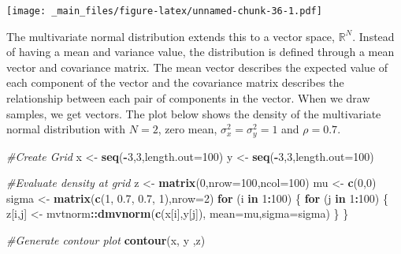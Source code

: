 \documentclass[
]{book}
\newenvironment{Shaded}{\begin{snugshade}}{\end{snugshade}}
\newcommand{\AttributeTok}[1]{\textcolor[rgb]{0.13,0.29,0.53}{#1}}
\newcommand{\CommentTok}[1]{\textcolor[rgb]{0.56,0.35,0.01}{\textit{#1}}}
\newcommand{\ControlFlowTok}[1]{\textcolor[rgb]{0.13,0.29,0.53}{\textbf{#1}}}
\newcommand{\DecValTok}[1]{\textcolor[rgb]{0.00,0.00,0.81}{#1}}
\newcommand{\FloatTok}[1]{\textcolor[rgb]{0.00,0.00,0.81}{#1}}
\newcommand{\FunctionTok}[1]{\textcolor[rgb]{0.13,0.29,0.53}{\textbf{#1}}}
\newcommand{\NormalTok}[1]{#1}
\newcommand{\OtherTok}[1]{\textcolor[rgb]{0.56,0.35,0.01}{#1}}
\newcommand{\SpecialCharTok}[1]{\textcolor[rgb]{0.81,0.36,0.00}{\textbf{#1}}}
\theoremstyle{definition}
\theoremstyle{definition}
\theoremstyle{definition}
\theoremstyle{definition}
\theoremstyle{remark}
\begin{document}
\texttt{[image: \_main\_files/figure-latex/unnamed-chunk-36-1.pdf]}

The multivariate normal distribution extends this to a vector space, \(\mathbb{R}^N\). Instead of having a mean and variance value, the distribution is defined through a mean vector and covariance matrix. The mean vector describes the expected value of each component of the vector and the covariance matrix describes the relationship between each pair of components in the vector. When we draw samples, we get vectors. The plot below shows the density of the multivariate normal distribution with \(N = 2\), zero mean, \(\sigma^2_x = \sigma^2_y = 1\) and \(\rho = 0.7\).

\begin{Shaded}
\begin{Highlighting}[]
\CommentTok{\#Create Grid}
\NormalTok{x }\OtherTok{\textless{}{-}} \FunctionTok{seq}\NormalTok{(}\SpecialCharTok{{-}}\DecValTok{3}\NormalTok{,}\DecValTok{3}\NormalTok{,}\AttributeTok{length.out=}\DecValTok{100}\NormalTok{)}
\NormalTok{y }\OtherTok{\textless{}{-}} \FunctionTok{seq}\NormalTok{(}\SpecialCharTok{{-}}\DecValTok{3}\NormalTok{,}\DecValTok{3}\NormalTok{,}\AttributeTok{length.out=}\DecValTok{100}\NormalTok{)}

\CommentTok{\#Evaluate density at grid}
\NormalTok{z }\OtherTok{\textless{}{-}} \FunctionTok{matrix}\NormalTok{(}\DecValTok{0}\NormalTok{,}\AttributeTok{nrow=}\DecValTok{100}\NormalTok{,}\AttributeTok{ncol=}\DecValTok{100}\NormalTok{)}
\NormalTok{mu }\OtherTok{\textless{}{-}} \FunctionTok{c}\NormalTok{(}\DecValTok{0}\NormalTok{,}\DecValTok{0}\NormalTok{)}
\NormalTok{sigma }\OtherTok{\textless{}{-}} \FunctionTok{matrix}\NormalTok{(}\FunctionTok{c}\NormalTok{(}\DecValTok{1}\NormalTok{, }\FloatTok{0.7}\NormalTok{, }\FloatTok{0.7}\NormalTok{, }\DecValTok{1}\NormalTok{),}\AttributeTok{nrow=}\DecValTok{2}\NormalTok{)}
\ControlFlowTok{for}\NormalTok{ (i }\ControlFlowTok{in} \DecValTok{1}\SpecialCharTok{:}\DecValTok{100}\NormalTok{) \{}
  \ControlFlowTok{for}\NormalTok{ (j }\ControlFlowTok{in} \DecValTok{1}\SpecialCharTok{:}\DecValTok{100}\NormalTok{) \{}
\NormalTok{    z[i,j] }\OtherTok{\textless{}{-}}\NormalTok{ mvtnorm}\SpecialCharTok{::}\FunctionTok{dmvnorm}\NormalTok{(}\FunctionTok{c}\NormalTok{(x[i],y[j]),}
                      \AttributeTok{mean=}\NormalTok{mu,}\AttributeTok{sigma=}\NormalTok{sigma)}
\NormalTok{  \}}
\NormalTok{\}}

\CommentTok{\#Generate contour plot}
\FunctionTok{contour}\NormalTok{(x, y ,z)}
\end{Highlighting}
\end{Shaded}
\end{document}
